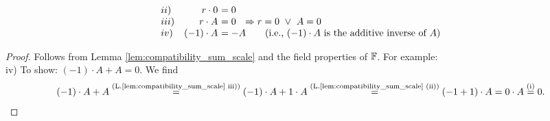 \begin{frame}
{\begin{corollary}
\begin{eqnarray*}
\begin{array}{lr@{~}l}
			ii)& r \cdot 0 & = 0 \\
			iii)& r\cdot A &= 0 ~~ \Rightarrow r = 0 ~\lor ~A = 0\\ 
			iv) & (-1)\cdot A &=    -A ~~~~~~\text{(i.e., $(-1)\cdot A$ is the additive inverse of $A$)}
		\end{array}  
	\end{eqnarray*}
\end{corollary}
\begin{proof} 
	\blank
	Follows from Lemma \ref{lem:compatibility_sum_scale} and the field properties of ${\mathbb{F}} $. For example:\\[0.2cm]
	iv) To show: $(-1)\cdot A  + A = 0$. We find 
	$$(-1)\cdot A  + A \stackrel{\text{(L.\ref{lem:compatibility_sum_scale} iii))}}{=} (-1)\cdot A  + 1\cdot  A \stackrel{\text{(L.\ref{lem:compatibility_sum_scale} (ii))}}{=} (-1 + 1)\cdot A = 0\cdot A \stackrel{\text{(i)}}{=} 0. $$
\end{proof}
}
 \end{frame}


